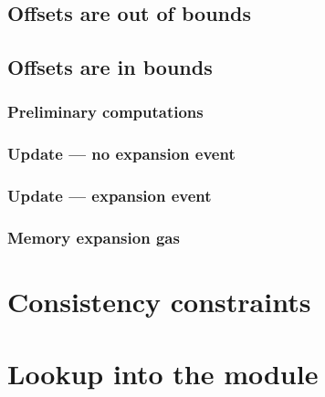\subsection{Offsets are out of bounds}                                                    
\subsection{Offsets are in bounds}                                                                                   
\subsubsection{Preliminary computations}                                                       
\subsubsection{Update --- no expansion event}                                             
\subsubsection{Update --- expansion event}                                                   
\subsubsection{Memory expansion gas}                                                       \label{mxp: mxp gas cost}
                                                                                                                            
\section{Consistency constraints}                                                                 \label{mxp: consistency}
                                                                                                                            
\section{Lookup into the \idMod{} module}                                                              \label{mxp: instruction decoding lookup}
